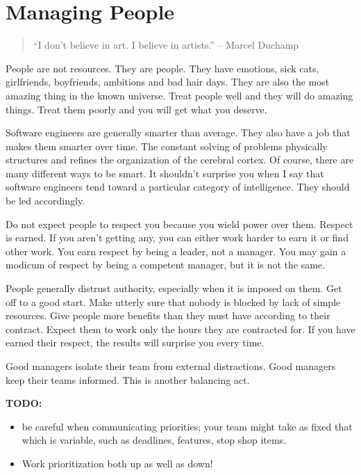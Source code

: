 %
%


\chapter{Managing People}

\begin{quote}
``I don't believe in art. I believe in artists.'' -- Marcel Duchamp
\end{quote}

People are not resources. They are people. They have emotions, sick cats, girlfriends, boyfriends, ambitions and bad hair days. They are also the most amazing thing in the known universe. Treat people well and they will do amazing things.  Treat them poorly and you will get what you deserve.

Software engineers are generally smarter than average. They also have a job that makes them smarter over time. The constant solving of problems physically structures and refines the organization of the cerebral cortex. Of course, there are many different ways to be smart. It shouldn't surprise you when I say that software engineers tend toward a particular category of intelligence. They should be led accordingly.

Do not expect people to respect you because you wield power over them.  Respect is earned.  If you aren't getting any, you can either work harder to earn it or find other work. You earn respect by being a leader, not a manager.  You may gain a modicum of respect by being a competent manager, but it is not the same.

People generally distrust authority, especially when it is imposed on them.  Get off to a good start.  Make utterly sure that nobody is blocked by lack of simple resources.  Give people more benefits than they must have according to their contract.  Expect them to work only the hours they are contracted for.  If you have earned their respect, the results will surprise you every time.

Good managers isolate their team from external distractions. Good managers keep their teams informed.  This is another balancing act.

\textbf{TODO:} 
\begin{itemize}
\item be careful when communicating priorities; your team might take as fixed that which is variable, such as deadlines, features, stop shop items. 
\item Work prioritization both up as well as down!
\end{itemize}


